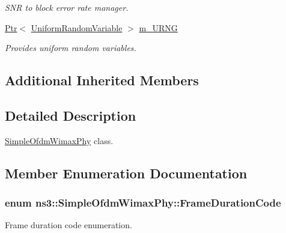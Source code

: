 \begin{DoxyCompactItemize}
\begin{DoxyCompactList}\small\item\em S\+NR to block error rate manager. \end{DoxyCompactList}\item 
\hyperlink{classns3_1_1Ptr}{Ptr}$<$ \hyperlink{classns3_1_1UniformRandomVariable}{Uniform\+Random\+Variable} $>$ \hyperlink{classns3_1_1SimpleOfdmWimaxPhy_a4cf477c7c9eed77333bd5833cc3ba6d3}{m\+\_\+\+U\+R\+NG}
\begin{DoxyCompactList}\small\item\em Provides uniform random variables. \end{DoxyCompactList}\end{DoxyCompactItemize}
\subsection*{Additional Inherited Members}


\subsection{Detailed Description}
\hyperlink{classns3_1_1SimpleOfdmWimaxPhy}{Simple\+Ofdm\+Wimax\+Phy} class. 

\subsection{Member Enumeration Documentation}
\subsubsection[{\texorpdfstring{Frame\+Duration\+Code}{FrameDurationCode}}]{\setlength{\rightskip}{0pt plus 5cm}enum {\bf ns3\+::\+Simple\+Ofdm\+Wimax\+Phy\+::\+Frame\+Duration\+Code}}\hypertarget{classns3_1_1SimpleOfdmWimaxPhy_a81778c2233487351f2136fe80c63e1e4}{}\label{classns3_1_1SimpleOfdmWimaxPhy_a81778c2233487351f2136fe80c63e1e4}


Frame duration code enumeration. 

